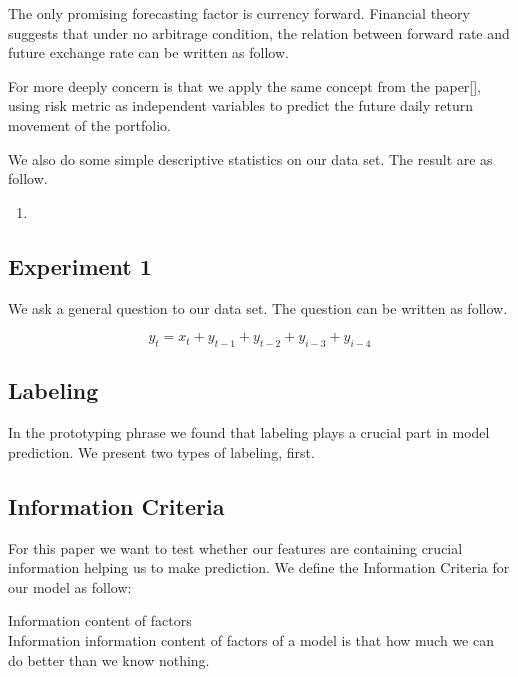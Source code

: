     The only promising forecasting factor is currency forward. Financial theory suggests that under no arbitrage condition, the relation between forward rate and future exchange rate can be written as follow.

    For more deeply concern is that we apply the same concept from the paper[], using risk metric as independent variables to predict the future daily return movement of the portfolio.
    
    We also do some simple descriptive statistics on our data set. The result are as follow.
    


\begin{enumerate}
\item{}
\end{enumerate}


\subsection{Experiment 1}
    We ask a general question to our data set. The question can be written as follow.

$$ y_{t} = x_{t} + y_{t-1} +y_{t-2} + y_{i-3} +y_{i-4} $$

\subsection{Labeling}
    In the prototyping phrase we found that labeling plays a crucial part in model prediction. 
We present two types of labeling, first.

\subsection{Information Criteria}

    For this paper we want to test whether our features are containing crucial information helping us to make prediction.
We define the Information Criteria for our model as follow:

\begin{defn}
Information content of factors\\
Information information content of factors of a model is that how much we can do better than we know nothing.
\end{defn}


